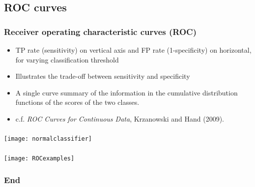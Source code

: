 \subsection{ROC curves}

\begin{frame}
\frametitle{Receiver operating characteristic curves (ROC)}
\begin{itemize}
\item TP rate (sensitivity) on vertical axis and FP rate (1-specificity) on horizontal, for varying classification threshold
\item Illustrates the \alert{trade-off} between sensitivity and specificity 
\item A single curve summary of the information in the cumulative distribution functions of the scores of the two classes.
\item c.f. {\it ROC Curves for Continuous Data}, Krzanowski and Hand (2009).
\end{itemize}
\end{frame} 

\begin{frame}
\frametitle{}
 \texttt{[image: normalclassifier]}
\end{frame} 


\begin{frame}
\frametitle{}
 \texttt{[image: ROCexamples]}
\end{frame} 

\begin{frame}
\frametitle{End}
\end{frame} 
